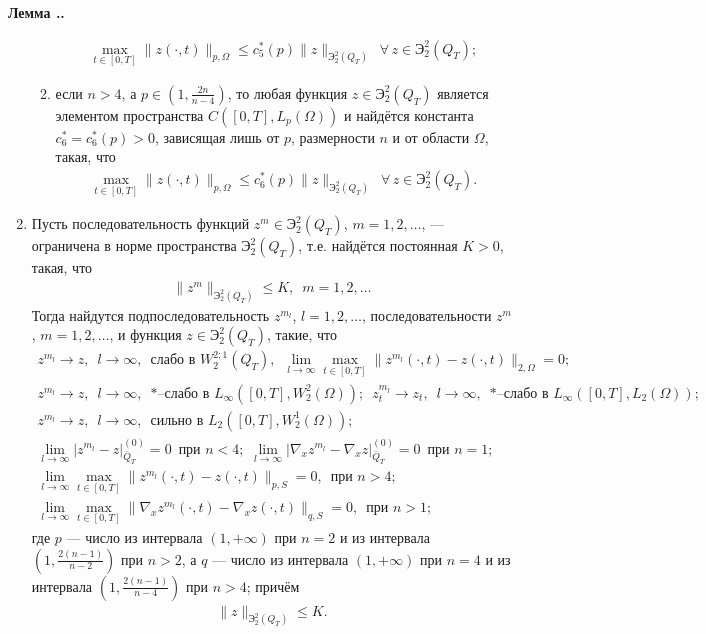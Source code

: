 \documentclass{report}
\newcounter{lem}[section]
\renewcommand{\thelem}{\thesection.\arabic{lem}}
\newenvironment{Lemma}{\par\refstepcounter{lem}\bf Лемма \thelem. \it}{\rm\par}
\begin{document}
\begin{Lemma}
\begin{enumerate}
\begin{enumerate}
\begin{gather*}
\max\limits_{t\in[0,T]}\|z(\cdot,t)\|_{p,\Omega}\leqslant c^*_5(p)\|z\|_{\textrm{Э}^{2}_{2}(Q_T)}\,\,\,\forall\,z\in \textrm{Э}^{2}_{2}(Q_T);
\end{gather*}
    \item
если $n>4$, а $p\in(1,\frac{2n}{n-4})$, то любая функция $z\in \textrm{Э}^{2}_{2}(Q_T)$ является элементом пространства $C([0,T],L_p(\Omega))$ и
найдётся константа $c^*_6=c_6^*(p)>0$, зависящая лишь от $p$, размерности $n$ и от области $\Omega$, такая, что
\begin{gather*}
\max\limits_{t\in[0,T]}\|z(\cdot,t)\|_{p,\Omega}\leqslant c^*_6(p)\|z\|_{\textrm{Э}^{2}_{2}(Q_T)}\,\,\,\forall\,z\in \textrm{Э}^{2}_{2}(Q_T).
\end{gather*}
\end{enumerate}

    \item
Пусть последовательность функций ${z}^m\in \textrm{Э}^{2}_{2}(Q_T)$, $m=1,2,\dots$, --- ограничена в норме пространства $\textrm{Э}^{2}_{2}(Q_T)$, т.е. найдётся постоянная $K>0$, такая, что
\begin{gather*}
\|{z}^m\|_{\textrm{Э}^{2}_{2}(Q_T)}\leqslant K,\,\,\,m=1,2,\dots
\end{gather*}
Тогда найдутся подпоследовательность $z^{m_l}$, $l=1,2,\dots$, последовательности $z^{m}$, $m=1,2,\dots$, и функция $z\in \textrm{Э}^{2}_{2}(Q_T)$,
такие, что
\begin{gather*}
z^{m_l}\to z,\,\,\,l\to\infty,\,\,\,\mbox{слабо в $W^{2;1}_{2}(Q_T)$},\,\,\,\lim\limits_{l\to\infty}\max\limits_{t\in[0,T]}\|z^{m_l}(\cdot,t)-z(\cdot,t)\|_{2,\Omega}=0;\\
z^{m_l}\to z,\,\,\,l\to\infty,\,\,\,\mbox{$*$--слабо в $L_\infty([0,T],W^2_{2}(\Omega))$};\,\,\,
z^{m_l}_t\to z_t,\,\,\,l\to\infty,\,\,\,\mbox{$*$--слабо в $L_\infty([0,T],L_{2}(\Omega))$};\\
{z}^{m_l}\to{z},\,\,\,l\to\infty,\,\,\,\mbox{сильно в $L_2([0,T],{W}^1_{2}(\Omega))$;}\\
\lim\limits_{l\to\infty}\pmb{|}z^{m_l}-z\pmb{|}^{(0)}_{\bar Q_T}=0\,\,\,\text{при $n<4$;}\,\,\,
\lim\limits_{l\to\infty}\pmb{|}\nabla_xz^{m_l}-\nabla_xz\pmb{|}^{(0)}_{\bar Q_T}=0\,\,\,\text{при $n=1$;}\\
\lim\limits_{l\to\infty}\max\limits_{t\in[0,T]}\|z^{m_l}(\cdot,t)-z(\cdot,t)\|_{p,S}=0,\,\,\,\text{при $n>4$;}\\
\lim\limits_{l\to\infty}\max\limits_{t\in[0,T]}\|\nabla_xz^{m_l}(\cdot,t)-\nabla_xz(\cdot,t)\|_{q,S}=0,\,\,\,\text{при $n>1$;}
\end{gather*}
где $p$ --- число из интервала $(1,+\infty)$ при $n=2$ и из интервала $(1,\frac{2(n-1)}{n-2})$ при $n>2$, а
$q$ --- число из интервала $(1,+\infty)$ при $n=4$ и из интервала $(1,\frac{2(n-1)}{n-4})$ при $n>4$; причём
\begin{gather*}
\|z\|_{\textrm{Э}^{2}_{2}(Q_T)}\leqslant K.
\end{gather*}
\end{enumerate}
\end{Lemma}
\end{document}
